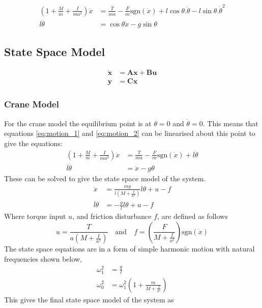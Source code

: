 \documentclass{article}
\begin{document}
\begin{align}
  \left( 1 + \frac{M}{m} + \frac{I}{ma^2} \right) \ddot{x} &= \frac{T}{ma} - \frac{F}{m}\text{sgn}(\dot{x}) + l\cos\theta . \ddot{\theta} - l\sin\theta . \dot{\theta}^2 \label{eq:motion_1} \\
  l \ddot{\theta} &= \cos\theta \ddot{x} - g\sin\theta \label{eq:motion_2}
\end{align}

\subsection{State Space Model}

\begin{align}
  \mathbf{\dot{x}} &= \mathbf{Ax} + \mathbf{Bu} \\
  \mathbf{y} &= \mathbf{Cx}
\end{align}

\subsubsection{Crane Model}

For the crane model the equilibrium point is at $\theta = 0$ and $\dot{\theta} = 0$.
This means that equations \ref{eq:motion_1} and \ref{eq:motion_2} can be linearised about this point to give the equations:
\begin{align}
  \left( 1 + \frac{M}{m} + \frac{I}{ma^2} \right) \ddot{x} &= \frac{T}{ma} - \frac{F}{m}\text{sgn}(\dot{x}) + l \ddot{\theta} \label{eq:crane_motion_1} \\
  l \ddot{\theta} &= \ddot{x} - g\theta \label{eq:crane_motion_2}
\end{align}
These can be solved to give the state space model of the system.
\begin{align}
  \ddot{x} &= \frac{mg}{l\left(M+\frac{I}{a^2}\right)} l\theta + u - f \\
  \ddot{l\theta} &= -\frac{g}{l}l\theta + u - f
\end{align}
Where torque input $u$, and friction disturbance $f$, are defined as follows
\begin{equation}
  u = \frac{T}{a\left(M+\frac{I}{a^2}\right)} \quad \text{and} \quad f = \left(\frac{F}{M + \frac{I}{a^2}} \right) \text{sgn} (\dot{x})
\end{equation}
The state space equations are in a form of simple harmonic motion with natural frequencies shown below,
\begin{align}
  \omega_1^2 &= \frac{g}{l} \\
  \omega_0^2 &= \omega_1^2\left(1 + \frac{m}{M+\frac{I}{a^2}} \right)
\end{align}
This gives the final state space model of the system as
\end{document}
